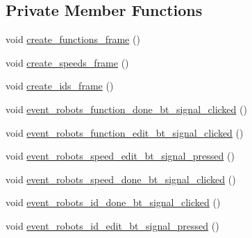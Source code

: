 \subsection*{Private Member Functions}
\begin{DoxyCompactItemize}
\item 
void \hyperlink{class_robot_g_u_i_ae936fdefc6553a75ec8c1971c50c4add}{create\+\_\+functions\+\_\+frame} ()
\item 
void \hyperlink{class_robot_g_u_i_a05b171a9b805af42e32ed9036478dafe}{create\+\_\+speeds\+\_\+frame} ()
\item 
void \hyperlink{class_robot_g_u_i_a0aa53fbc31e2740779cb078f440a4891}{create\+\_\+ids\+\_\+frame} ()
\item 
void \hyperlink{class_robot_g_u_i_a772f8b103a92bc866827c5553451120e}{event\+\_\+robots\+\_\+function\+\_\+done\+\_\+bt\+\_\+signal\+\_\+clicked} ()
\item 
void \hyperlink{class_robot_g_u_i_a7b15515d7ea036f2b59d62bc6cdc476b}{event\+\_\+robots\+\_\+function\+\_\+edit\+\_\+bt\+\_\+signal\+\_\+clicked} ()
\item 
void \hyperlink{class_robot_g_u_i_ad3e49c942794d65e38600e7d48681fa1}{event\+\_\+robots\+\_\+speed\+\_\+edit\+\_\+bt\+\_\+signal\+\_\+pressed} ()
\item 
void \hyperlink{class_robot_g_u_i_a7acb7bdc8533f946f2cbea74966147cc}{event\+\_\+robots\+\_\+speed\+\_\+done\+\_\+bt\+\_\+signal\+\_\+clicked} ()
\item 
void \hyperlink{class_robot_g_u_i_a92e50bc76f093abdd93e6c4eddb40a63}{event\+\_\+robots\+\_\+id\+\_\+done\+\_\+bt\+\_\+signal\+\_\+clicked} ()
\item 
void \hyperlink{class_robot_g_u_i_a37c09ff17bc02e83aa616ac798b87ee7}{event\+\_\+robots\+\_\+id\+\_\+edit\+\_\+bt\+\_\+signal\+\_\+pressed} ()
\end{DoxyCompactItemize}
